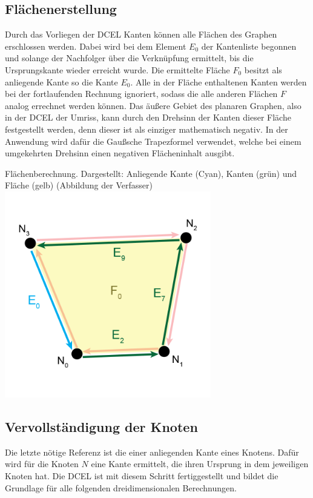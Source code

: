\subsection{Flächenerstellung}
Durch das Vorliegen der DCEL Kanten können alle Flächen des Graphen erschlossen werden.
Dabei wird bei dem Element $E_0$ der Kantenliste begonnen und solange der Nachfolger über die Verknüpfung ermittelt, bis die Ursprungskante wieder erreicht wurde.
Die ermittelte Fläche $F_0$ besitzt als anliegende Kante so die Kante $E_0$.
Alle in der Fläche enthaltenen Kanten werden bei der fortlaufenden Rechnung ignoriert, sodass die alle anderen Flächen $F$ analog errechnet werden können.
Das äußere Gebiet des planaren Graphen, also in der DCEL der Umriss, kann durch den Drehsinn der Kanten dieser Fläche festgestellt werden, denn dieser ist als einziger mathematisch negativ.
In der Anwendung wird dafür die Gaußsche Trapezformel verwendet, welche bei einem umgekehrten Drehsinn einen negativen Flächeninhalt ausgibt.

\begin{Bild}{Flächenberechnung. Dargestellt: Anliegende Kante (Cyan), Kanten (grün) und Fläche (gelb) (Abbildung der Verfasser)}
	\includegraphics[width = 90mm]{Bilder/FlaecheBerechnung}
\end{Bild}

\subsection{Vervollständigung der Knoten}
Die letzte nötige Referenz ist die einer anliegenden Kante eines Knotens.
Dafür wird für die Knoten $N$ eine Kante ermittelt, die ihren Ursprung in dem jeweiligen Knoten hat.
Die DCEL ist mit diesem Schritt fertiggestellt und bildet die Grundlage für alle folgenden dreidimensionalen Berechnungen.\label{key}
